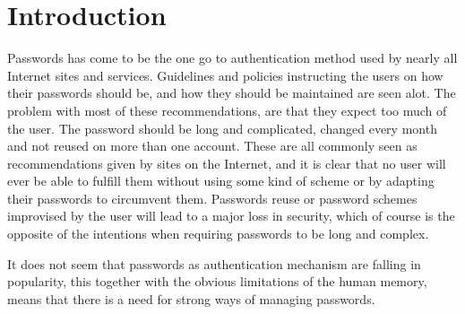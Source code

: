 \chapter{Introduction}
\label{chp:intro} 
Passwords has come to be the one go to authentication method used by nearly all Internet sites and services. Guidelines and policies instructing the users on how their passwords should be, and how they should be maintained are seen alot. The problem with most of these recommendations, are that they expect too much of the user. The password should be long and complicated, changed every month and not reused on more than one account. These are all commonly seen as recommendations given by sites on the Internet, and it is clear that no user will ever be able to fulfill them without using some kind of scheme or by adapting their passwords to circumvent them. Passwords reuse or password schemes improvised by the user will lead to a major loss in security, which of course is the opposite of the intentions when requiring passwords to be long and complex.  
\par It does not seem that passwords as authentication mechanism are falling in popularity, this together with the obvious limitations of the human memory, means that there is a need for strong ways of managing passwords. 


